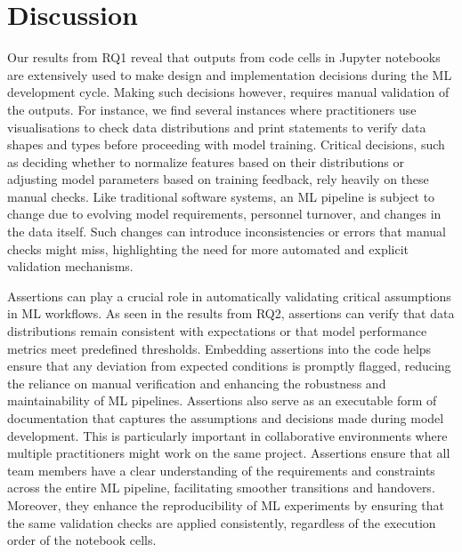 \section{Discussion}\label{sec:discuss}

Our results from RQ1 reveal that outputs from code cells in Jupyter notebooks are extensively used to make design and implementation decisions during the ML development cycle. Making such decisions however, requires manual validation of the outputs. For instance, we find several instances where practitioners use visualisations to check data distributions and print statements to verify data shapes and types before proceeding with model training. Critical decisions, such as deciding whether to normalize features based on their distributions or adjusting model parameters based on training feedback, rely heavily on these manual checks. Like traditional software systems, an ML pipeline is subject to change due to evolving model requirements, personnel turnover, and changes in the data itself. Such changes can introduce inconsistencies or errors that manual checks might miss, highlighting the need for more automated and explicit validation mechanisms. 

Assertions can play a crucial role in automatically validating critical assumptions in ML workflows. As seen in the results from RQ2, assertions can verify that data distributions remain consistent with expectations or that model performance metrics meet predefined thresholds. Embedding assertions into the code helps ensure that any deviation from expected conditions is promptly flagged, reducing the reliance on manual verification and enhancing the robustness and maintainability of ML pipelines. Assertions also serve as an executable form of documentation that captures the assumptions and decisions made during model development. This is particularly important in collaborative environments where multiple practitioners might work on the same project. Assertions ensure that all team members have a clear understanding of the requirements and constraints across the entire ML pipeline, facilitating smoother transitions and handovers. Moreover, they enhance the reproducibility of ML experiments by ensuring that the same validation checks are applied consistently, regardless of the execution order of the notebook cells.


